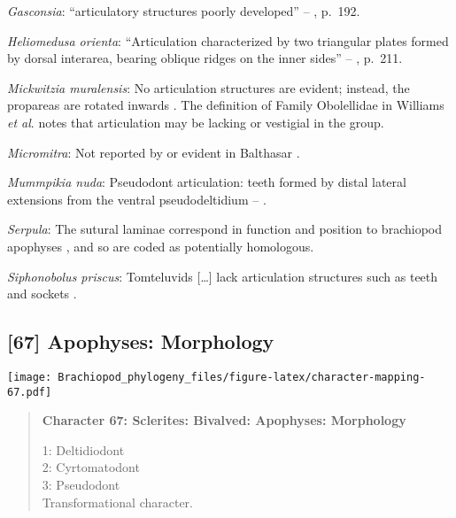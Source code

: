 \documentclass[openany]{book}
\theoremstyle{definition}
\theoremstyle{definition}
\theoremstyle{definition}
\theoremstyle{remark}
\begin{document}
\hypertarget{Gasconsia-coding-66}{}
\emph{Gasconsia}: ``articulatory structures poorly developed'' --
\citet{Williams2000LinguliformeaCraniiformea}, p.~192.

\hypertarget{Heliomedusa_orienta-coding-66}{}
\emph{Heliomedusa orienta}: ``Articulation characterized by two
triangular plates formed by dorsal interarea, bearing oblique ridges on
the inner sides'' -- \citet{Williams2000LinguliformeaCraniiformea},
p.~211.

\hypertarget{Mickwitzia_muralensis-coding-66}{}
\emph{Mickwitzia muralensis}: No articulation structures are evident;
instead, the propareas are rotated inwards
\citep{Balthasar2008iMummpikia}. The definition of Family Obolellidae in
Williams \emph{et al}.
\citeyearpar{Williams2000LinguliformeaCraniiformea} notes that
articulation may be lacking or vestigial in the group.

\hypertarget{Micromitra-coding-66}{}
\emph{Micromitra}: Not reported by or evident in Balthasar
\citeyearpar{Balthasar2004Shellstructure}.

\hypertarget{Mummpikia_nuda-coding-66}{}
\emph{Mummpikia nuda}: Pseudodont articulation: teeth formed by distal
lateral extensions from the ventral pseudodeltidium --
\citet{Holmer2018Evolutionarysignificance}.

\hypertarget{Serpula-coding-66}{}
\emph{Serpula}: The sutural laminae correspond in function and position
to brachiopod apophyses \citep{Connors2012}, and so are coded as
potentially homologous.

\hypertarget{Siphonobolus_priscus-coding-66}{}
\emph{Siphonobolus priscus}: Tomteluvids {[}\ldots{}{]} lack
articulation structures such as teeth and sockets
\citep{Streng2016Anew}.

\subsection*{{[}67{]} Apophyses: Morphology}\label{apophyses-morphology}

\texttt{[image: Brachiopod\_phylogeny\_files/figure-latex/character-mapping-67.pdf]}

\begin{quote}
\textbf{Character 67: Sclerites: Bivalved: Apophyses: Morphology}

1: Deltidiodont\\
2: Cyrtomatodont\\
3: Pseudodont\\
Transformational character.
\end{quote}
\end{document}
